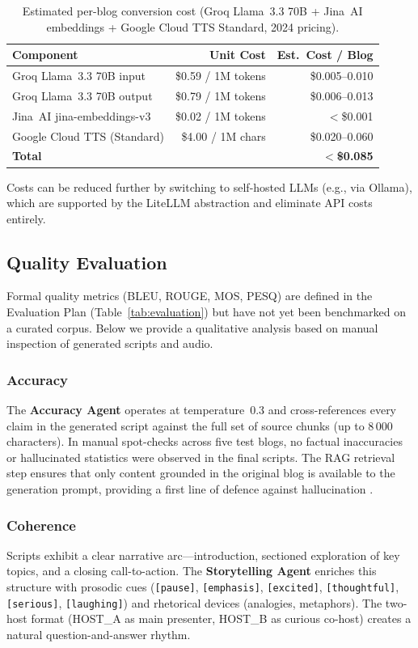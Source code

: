 \documentclass[sigconf,natbib=false]{acmart}   %
\begin{document}
\begin{table}[H]
\centering
\begin{tabular}{lrr}
\toprule
\textbf{Component} & \textbf{Unit Cost} & \textbf{Est.\ Cost / Blog}\\
\midrule
Groq Llama~3.3 70B input  & \$0.59 / 1M tokens  & \$0.005--0.010\\
Groq Llama~3.3 70B output & \$0.79 / 1M tokens  & \$0.006--0.013\\
Jina~AI jina-embeddings-v3 & \$0.02 / 1M tokens & $<$\$0.001\\
Google Cloud TTS (Standard) & \$4.00 / 1M chars  & \$0.020--0.060\\
\midrule
\textbf{Total}             &                     & \textbf{$<$\$0.085}\\
\bottomrule
\end{tabular}
\caption{Estimated per-blog conversion cost (Groq Llama~3.3 70B + Jina~AI embeddings + Google Cloud TTS Standard, 2024 pricing).}
\label{tab:cost}
\end{table}

Costs can be reduced further by switching to self-hosted LLMs (e.g., via Ollama), which are supported by the LiteLLM abstraction and eliminate API costs entirely.

\subsection{Quality Evaluation}
Formal quality metrics (BLEU, ROUGE, MOS, PESQ) are defined in the Evaluation Plan (Table~\ref{tab:evaluation}) but have not yet been benchmarked on a curated corpus.  Below we provide a qualitative analysis based on manual inspection of generated scripts and audio.

\subsubsection{Accuracy}
The \textbf{Accuracy Agent} operates at temperature~0.3 and cross-references every claim in the generated script against the full set of source chunks (up to 8\,000 characters).  In manual spot-checks across five test blogs, no factual inaccuracies or hallucinated statistics were observed in the final scripts.  The RAG retrieval step ensures that only content grounded in the original blog is available to the generation prompt, providing a first line of defence against hallucination \cite{Lewis2020RAG}.

\subsubsection{Coherence}
Scripts exhibit a clear narrative arc---introduction, sectioned exploration of key topics, and a closing call-to-action.  The \textbf{Storytelling Agent} enriches this structure with prosodic cues (\texttt{[pause]}, \texttt{[emphasis]}, \texttt{[excited]}, \texttt{[thoughtful]}, \texttt{[serious]}, \texttt{[laughing]}) and rhetorical devices (analogies, metaphors).  The two-host format (HOST\_A as main presenter, HOST\_B as curious co-host) creates a natural question-and-answer rhythm.
\end{document}

